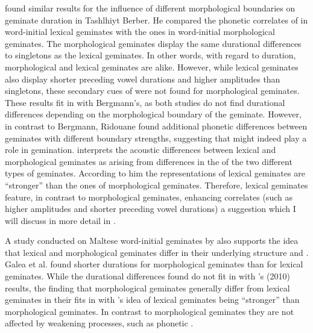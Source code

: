 \cite{Ridouane.2010} found similar results for the influence of different morphological boundaries on geminate duration in Tashlhiyt Berber. He compared the phonetic correlates of  in word-initial  lexical geminates with the ones in word-initial  morphological geminates. The  morphological geminates display the same durational differences to singletons as the  lexical geminates. In other words, with regard to duration, morphological and  lexical geminates are alike. However, while  lexical geminates also display shorter preceding vowel durations and higher amplitudes than singletons, these secondary cues of  were not found for  morphological geminates. These results fit in with Bergmann's, as both studies do not find durational differences depending on the morphological boundary of the geminate. However, in contrast to Bergmann, Ridouane found additional phonetic differences between geminates with different {boundary strengths}, suggesting that  might indeed play a role in {gemination}. 
\cite{Ridouane.2010} interprets the acoustic differences between lexical and  morphological geminates as arising from differences in the  of the two different types of geminates.  According to him the representations of  lexical geminates are ``stronger'' than the ones of  morphological geminates. Therefore,  lexical geminates feature, in contrast to  morphological geminates, enhancing correlates (such as higher amplitudes and shorter preceding vowel durations)  \textendash a suggestion which I will discuss in more detail in . 

A study conducted on Maltese word-initial geminates by \cite{Galea.2014} also supports the idea that lexical and  morphological geminates differ in their underlying structure and . Galea et al. found shorter durations for  morphological geminates than for  lexical geminates. While the durational differences found do not fit in with \citeauthor{Ridouane.2010}'s (2010) results, the finding that  morphological geminates generally differ from  lexical geminates in their  fits in with \citeauthor{Ridouane.2010}'s idea of  lexical geminates being ``stronger'' than  morphological geminates. In contrast to  morphological geminates they are not affected by weakening processes, such as phonetic . 

